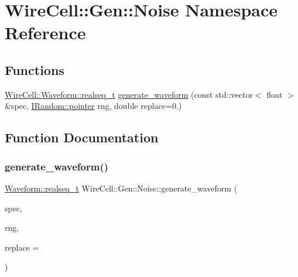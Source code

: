 \hypertarget{namespace_wire_cell_1_1_gen_1_1_noise}{}\section{Wire\+Cell\+:\+:Gen\+:\+:Noise Namespace Reference}
\label{namespace_wire_cell_1_1_gen_1_1_noise}
\subsection*{Functions}
\begin{DoxyCompactItemize}
\item 
\hyperlink{namespace_wire_cell_1_1_waveform_a479175e541c8545e87cd8063b74b6956}{Wire\+Cell\+::\+Waveform\+::realseq\+\_\+t} \hyperlink{namespace_wire_cell_1_1_gen_1_1_noise_ad7ec0edc1ec5b6bd4ab3525d091eedba}{generate\+\_\+waveform} (const std\+::vector$<$ float $>$ \&spec, \hyperlink{class_wire_cell_1_1_interface_a09c548fb8266cfa39afb2e74a4615c37}{I\+Random\+::pointer} rng, double replace=0.)
\end{DoxyCompactItemize}


\subsection{Function Documentation}
\mbox{\label{namespace_wire_cell_1_1_gen_1_1_noise_ad7ec0edc1ec5b6bd4ab3525d091eedba}} 
\subsubsection{\texorpdfstring{generate\+\_\+waveform()}{generate\_waveform()}}
{\footnotesize\ttfamily \hyperlink{namespace_wire_cell_1_1_waveform_a479175e541c8545e87cd8063b74b6956}{Waveform\+::realseq\+\_\+t} Wire\+Cell\+::\+Gen\+::\+Noise\+::generate\+\_\+waveform (\begin{DoxyParamCaption}\item[{const std\+::vector$<$ float $>$ \&}]{spec,  }\item[{\hyperlink{class_wire_cell_1_1_interface_a09c548fb8266cfa39afb2e74a4615c37}{I\+Random\+::pointer}}]{rng,  }\item[{double}]{replace = {} }\end{DoxyParamCaption})}



